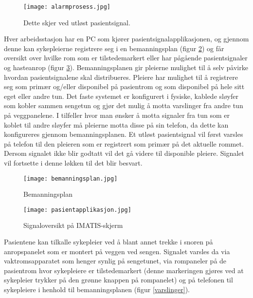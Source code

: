 \begin{figure}[H]
\centering
\texttt{[image: alarmprosess.jpg]}
\caption{Dette skjer ved utløst pasientsignal.}
\label{fig:detteskjer}
\end{figure}

\noindent
Hver arbeidsstasjon har en PC som kjører pasientsignalapplikasjonen, og gjennom denne kan sykepleierne registrere seg i en bemanningsplan (figur \ref{IMATISbemanningsplan}) og får oversikt over hvilke rom som er tilstedemarkert eller har pågående pasientsignaler og hasteanrop (figur \ref{IMATISpasientapplikasjon}). Bemanningsplanen gir pleierne mulighet til å selv påvirke hvordan pasientsignalene skal distribueres. Pleiere har mulighet til å registrere seg som primær og/eller disponibel på pasientrom og som disponibel på hele sitt eget eller andre tun. Det faste systemet er konfigurert i fysiske, kablede sløyfer som kobler sammen sengetun og gjør det mulig å motta varslinger fra andre tun på veggpanelene. I tilfeller hvor man ønsker å motta signaler fra tun som er koblet til andre sløyfer må pleierne motta disse på sin telefon, da dette kan konfigureres gjennom bemanningsplanen. Et utløst pasientsignal vil først varsles på telefon til den pleieren som er registrert som primær på det aktuelle rommet. Dersom signalet ikke blir godtatt vil det gå videre til disponible pleiere. Signalet vil fortsette i denne løkken til det blir besvart.

\begin{figure}[H]
\centering
\texttt{[image: bemanningsplan.jpg]}
\caption{Bemanningsplan}
\label{IMATISbemanningsplan}
\end{figure}

\begin{figure}[H]
\centering
\texttt{[image: pasientapplikasjon.jpg]}
\caption{Signaloversikt på IMATIS-skjerm}
\label{IMATISpasientapplikasjon}
\end{figure}

\noindent
Pasientene kan tilkalle sykepleier ved å blant annet trekke i snoren på anropspanelet som er montert på veggen ved sengen. Signalet varsles da via vaktromsapparatet som henger synlig på sengetunet, via rompaneler på de pasientrom hvor sykepleiere er tilstedemarkert (denne markeringen gjøres ved at sykepleier trykker på den grønne knappen på rompanelet) og på telefonen til sykepleiere i henhold til bemanningsplanen (figur \ref{varslinger}). 

